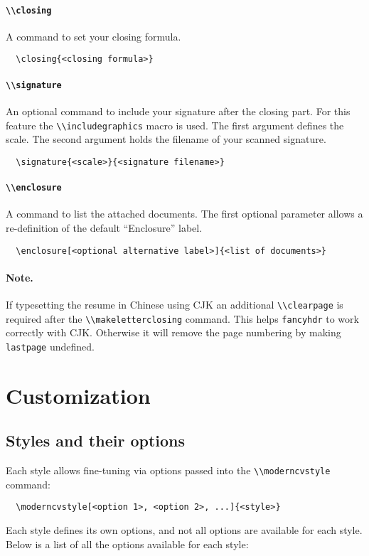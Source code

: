 \documentclass[a4paper, 11pt]{article}
\newcommand{\note}{\paragraph{Note.}}
\newcommand{\code}[1]{\lstinline!#1!}
\begin{document}
\paragraph{\code{\\closing}}
A command to set your closing formula.
\begin{lstlisting}
  \closing{<closing formula>}
\end{lstlisting}

\paragraph{\code{\\signature}}
An optional command to include your signature after the closing part. For this feature the \code{\\includegraphics} macro is used. The first argument defines the scale. The second argument holds the filename of your scanned signature.
\begin{lstlisting}
  \signature{<scale>}{<signature filename>}
\end{lstlisting}

\paragraph{\code{\\enclosure}}
A command to list the attached documents. The first optional parameter allows a re-definition of the default ``Enclosure'' label.
\begin{lstlisting}
  \enclosure[<optional alternative label>]{<list of documents>}
\end{lstlisting}

\note If typesetting the resume in Chinese using CJK an additional \code{\\clearpage} is required after the \code{\\makeletterclosing} command. This helps \code{fancyhdr} to work correctly with CJK. Otherwise it will remove the page numbering by making \code{lastpage} undefined.

\section{Customization}
\label{section:customization}
\subsection{Styles and their options}
\label{section:customization:stylesAndOptions}
Each style allows fine-tuning via options passed into the \code{\\moderncvstyle} command:
\begin{lstlisting}
  \moderncvstyle[<option 1>, <option 2>, ...]{<style>}
\end{lstlisting}
Each style defines its own options, and not all options are available for each style.
Below is a list of all the options available for each style:
\end{document}
